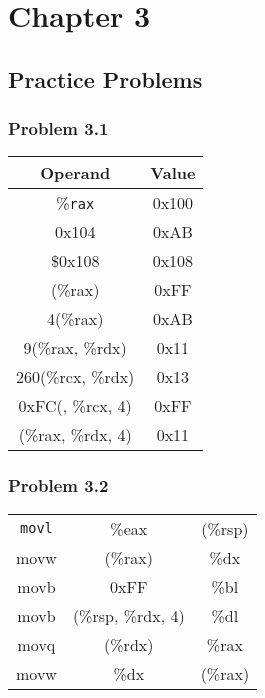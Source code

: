 \documentclass[a4paper]{article}
\begin{document}
\subsubsection*{}




\section*{Chapter 3}

\subsection*{Practice Problems}

\subsubsection*{Problem 3.1}
\begin{tabular}{cc}
    \rm{Operand}&\rm{Value}\\\hline
    \%\tt{rax}&0x100\\
    0x104&0xAB\\
    \$0x108&0x108\\
    (\%rax)&0xFF\\
    4(\%rax)&0xAB\\
    9(\%rax, \%rdx)&0x11\\
    260(\%rcx, \%rdx)&0x13\\
    0xFC(, \%rcx, 4)&0xFF\\
    (\%rax, \%rdx, 4)&0x11    
\end{tabular} 

\subsubsection*{Problem 3.2}
\begin{tabular}{ccc}
    \tt{movl}&\%eax&(\%rsp)\\
    movw&(\%rax)&\%dx\\
    movb&0xFF&\%bl\\
    movb&(\%rsp, \%rdx, 4)&\%dl\\
    movq&(\%rdx)&\%rax\\
    movw&\%dx&(\%rax)
    
\end{tabular}

\end{document}
